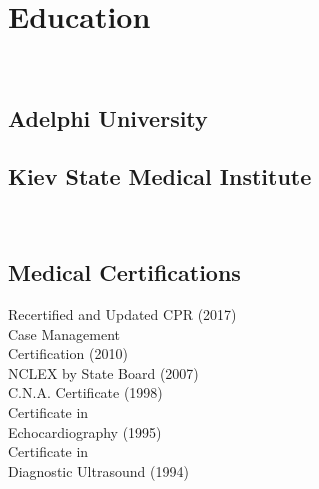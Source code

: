 \documentclass[]{deedy-resume-openfont}
\begin{document}
%
%


%
%

\begin{minipage}[t]{0.31\textwidth} 

\\[1\baselineskip]
\section{Education} 
\\[1\baselineskip]

\subsection{Adelphi University}
\sectionsep

\subsection{Kiev State Medical Institute }
\\[1\baselineskip]

\subsection{Medical Certifications}
\textbullet{} Recertified and Updated CPR (2017) \\
\sectionsep
\textbullet{} Case Management \\
Certification (2010) \\
\sectionsep
\textbullet{} NCLEX by State Board (2007) \\
\sectionsep
\textbullet{} C.N.A. Certificate (1998) \\
\sectionsep
\textbullet{} Certificate in \\
Echocardiography (1995) \\
\sectionsep
\textbullet{} Certificate in \\
Diagnostic Ultrasound (1994)
\\[1\baselineskip]


\end{minipage}
\end{document}
